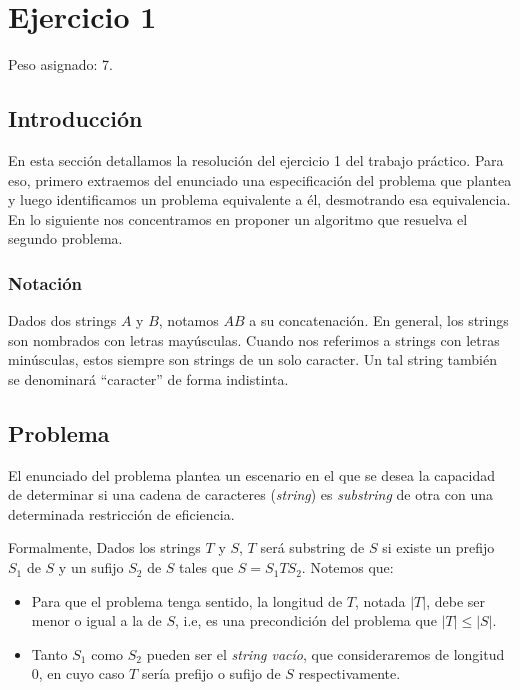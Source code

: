 \section{Ejercicio 1}

Peso asignado: 7.

\subsection{Introducción}

En esta sección detallamos la resolución del ejercicio 1 del trabajo práctico. Para eso, primero extraemos del enunciado una especificación del problema que plantea y luego identificamos un problema equivalente a él, desmotrando esa equivalencia. En lo siguiente nos concentramos en proponer un algoritmo que resuelva el segundo problema.

\subsubsection{Notación}

Dados dos strings $A$ y $B$, notamos $AB$ a su concatenación. En general, los strings son nombrados con letras mayúsculas. Cuando nos referimos a strings con letras minúsculas, estos siempre son strings de un solo caracter. Un tal string también se denominará ``caracter'' de forma indistinta.

\subsection{Problema}

El enunciado del problema plantea un escenario en el que se desea la capacidad de determinar si una cadena de caracteres (\textit{string}) es \textit{substring} de otra con una determinada restricción de eficiencia.

Formalmente, Dados los strings $T$ y $S$, $T$ será substring de $S$ si existe un prefijo $S_1$ de $S$ y un sufijo $S_2$ de $S$ tales que $S = S_1 T S_2$. Notemos que:
\begin{itemize}
\item Para que el problema tenga sentido, la longitud de $T$, notada $|T|$, debe ser menor o igual a la de $S$, i.e, es una precondición del problema que $|T| \leq |S|$.
\item Tanto $S_1$ como $S_2$ pueden ser el \textit{string vacío}, que consideraremos de longitud $0$, en cuyo caso $T$ sería prefijo o sufijo de $S$ respectivamente.
\end{itemize}

